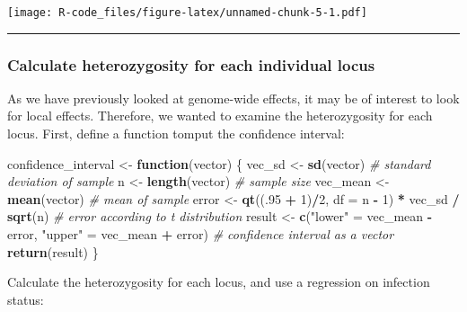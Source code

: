 \documentclass[]{article}
\newenvironment{Shaded}{\begin{snugshade}}{\end{snugshade}}
\newcommand{\KeywordTok}[1]{\textcolor[rgb]{0.13,0.29,0.53}{\textbf{#1}}}
\newcommand{\DataTypeTok}[1]{\textcolor[rgb]{0.13,0.29,0.53}{#1}}
\newcommand{\DecValTok}[1]{\textcolor[rgb]{0.00,0.00,0.81}{#1}}
\newcommand{\StringTok}[1]{\textcolor[rgb]{0.31,0.60,0.02}{#1}}
\newcommand{\CommentTok}[1]{\textcolor[rgb]{0.56,0.35,0.01}{\textit{#1}}}
\newcommand{\ControlFlowTok}[1]{\textcolor[rgb]{0.13,0.29,0.53}{\textbf{#1}}}
\newcommand{\OperatorTok}[1]{\textcolor[rgb]{0.81,0.36,0.00}{\textbf{#1}}}
\newcommand{\NormalTok}[1]{#1}
\begin{document}
\texttt{[image: R-code\_files/figure-latex/unnamed-chunk-5-1.pdf]}

\begin{center}\rule{0.5\linewidth}{\linethickness}\end{center}

\subsubsection{Calculate heterozygosity for each individual
locus}\label{calculate-heterozygosity-for-each-individual-locus}

As we have previously looked at genome-wide effects, it may be of
interest to look for local effects. Therefore, we wanted to examine the
heterozygosity for each locus. First, define a function tomput the
confidence interval:

\begin{Shaded}
\begin{Highlighting}[]
\NormalTok{confidence_interval <-}\StringTok{ }\ControlFlowTok{function}\NormalTok{(vector) \{}
\NormalTok{  vec_sd <-}\StringTok{ }\KeywordTok{sd}\NormalTok{(vector)        }\CommentTok{# standard deviation of sample}
\NormalTok{  n <-}\StringTok{ }\KeywordTok{length}\NormalTok{(vector)         }\CommentTok{# sample size}
\NormalTok{  vec_mean <-}\StringTok{ }\KeywordTok{mean}\NormalTok{(vector)    }\CommentTok{# mean of sample}
\NormalTok{  error <-}\StringTok{ }\KeywordTok{qt}\NormalTok{((.}\DecValTok{95} \OperatorTok{+}\StringTok{ }\DecValTok{1}\NormalTok{)}\OperatorTok{/}\DecValTok{2}\NormalTok{, }\DataTypeTok{df =}\NormalTok{ n }\OperatorTok{-}\StringTok{ }\DecValTok{1}\NormalTok{) }\OperatorTok{*}\StringTok{ }\NormalTok{vec_sd }\OperatorTok{/}\StringTok{ }\KeywordTok{sqrt}\NormalTok{(n)               }\CommentTok{# error according to t distribution}
\NormalTok{  result <-}\StringTok{ }\KeywordTok{c}\NormalTok{(}\StringTok{"lower"}\NormalTok{ =}\StringTok{ }\NormalTok{vec_mean }\OperatorTok{-}\StringTok{ }\NormalTok{error, }\StringTok{"upper"}\NormalTok{ =}\StringTok{ }\NormalTok{vec_mean }\OperatorTok{+}\StringTok{ }\NormalTok{error)   }\CommentTok{# confidence interval as a vector}
  \KeywordTok{return}\NormalTok{(result)}
\NormalTok{\}}
\end{Highlighting}
\end{Shaded}

Calculate the heterozygosity for each locus, and use a regression on
infection status:
\end{document}
